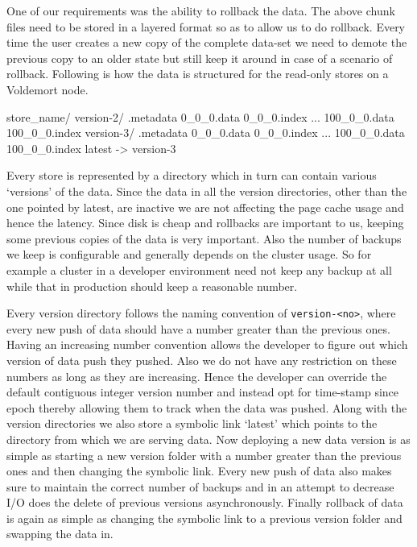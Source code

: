\documentclass[10pt,twocolumn,preprint,natbib,authoryear]{sigplanconf}
\begin{document}
One of our requirements was the ability to rollback the data. The above chunk files need to be stored in a layered format so as to allow us to do rollback. Every time the user creates a new copy of the complete data-set we need to demote the previous copy to an older state but still keep it around in case of a scenario of rollback. Following is how the data is structured for the read-only stores on a Voldemort node. 

\scriptsize
\begin{verbatimtab}
store_name/
  version-2/
    .metadata
    0_0_0.data
    0_0_0.index
    ...
    100_0_0.data
    100_0_0.index
  version-3/
    .metadata
    0_0_0.data
    0_0_0.index
    ...
    100_0_0.data
    100_0_0.index
  latest -> version-3
\end{verbatimtab}
\normalsize

Every store is represented by a directory which in turn can contain various `versions' of the data. Since the data in all the version directories, other than the one pointed by latest, are inactive we are not affecting the page cache usage and hence the latency. Since disk is cheap and rollbacks are important to us, keeping some previous copies of the data is very important. Also the number of backups we keep is configurable and generally depends on the cluster usage. So for example a cluster in a developer environment need not keep any backup at all while that in production should keep a reasonable number.

Every version directory follows the naming convention of \verb=version-<no>=, where every new push of data should have a number greater than the previous ones. Having an increasing number convention allows the developer to figure out which version of data push they pushed. Also we do not have any restriction on these numbers as long as they are increasing. Hence the developer can override the default contiguous integer version number and instead opt for time-stamp since epoch thereby allowing them to track when the data was pushed. Along with the version directories we also store a symbolic link `latest' which points to the directory from which we are serving data. Now deploying a new data version is as simple as starting a new version folder with a number greater than the previous ones and then changing the symbolic link. Every new push of data also makes sure to maintain the correct number of backups and in an attempt to decrease I/O does the delete of previous versions asynchronously. Finally rollback of data is again as simple as changing the symbolic link to a previous version folder and swapping the data in. 
\end{document}
